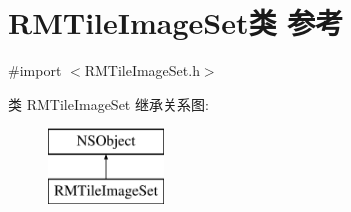 \hypertarget{interface_r_m_tile_image_set}{\section{R\-M\-Tile\-Image\-Set类 参考}
\label{interface_r_m_tile_image_set}
}


{\ttfamily \#import $<$R\-M\-Tile\-Image\-Set.\-h$>$}

类 R\-M\-Tile\-Image\-Set 继承关系图\-:\begin{figure}[H]
\begin{center}
\leavevmode
\includegraphics[height=2.000000cm]{interface_r_m_tile_image_set}
\end{center}
\end{figure}
